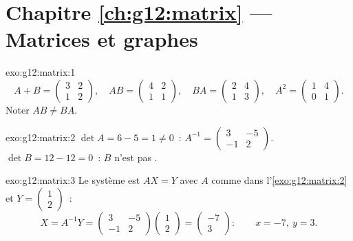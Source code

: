 \section*{Chapitre \ref{ch:g12:matrix} --- Matrices et graphes}

\begin{solution}{exo:g12:matrix:1}
\[
A + B = \begin{pmatrix} 3 & 2\\ 1 & 2\end{pmatrix}, \quad
AB = \begin{pmatrix} 4 & 2\\ 1 & 1\end{pmatrix}, \quad
BA = \begin{pmatrix} 2 & 4\\ 1 & 3\end{pmatrix}, \quad
A^2 = \begin{pmatrix} 1 & 4\\ 0 & 1\end{pmatrix}.
\]
Noter $AB \neq BA$.
\end{solution}

\begin{solution}{exo:g12:matrix:2}
$\det A = 6 - 5 = 1 \neq 0$~:
$A^{-1} = \begin{pmatrix} 3 & -5\\ -1 & 2 \end{pmatrix}$.
$\det B = 12 - 12 = 0$~: $B$ n'est pas .
\end{solution}

\begin{solution}{exo:g12:matrix:3}
Le système est $AX = Y$ avec $A$ comme dans l'\cref{exo:g12:matrix:2} et
$Y = \begin{pmatrix} 1\\ 2\end{pmatrix}$~:
\[
X = A^{-1}Y = \begin{pmatrix} 3 & -5\\ -1 & 2\end{pmatrix}
\begin{pmatrix} 1\\ 2\end{pmatrix}
= \begin{pmatrix} -7\\ 3\end{pmatrix}:
\qquad x = -7,\ y = 3 .
\]
\end{solution}

